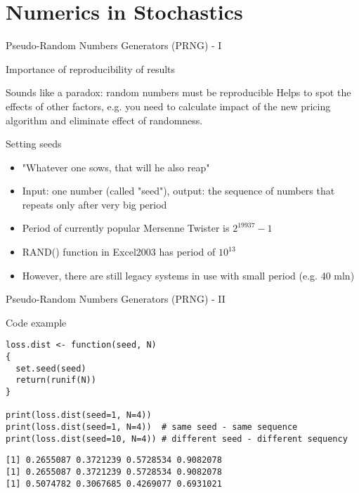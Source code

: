 \documentclass[presentation]{beamer}
\begin{document}
\section{Numerics in Stochastics}
\label{sec-2}
\begin{frame}[label=sec-2-1]{Pseudo-Random Numbers Generators (PRNG) - I}
\begin{block}{Importance of reproducibility of results}
\begin{block}{Sounds like a paradox: random numbers must be reproducible}
Helps to spot the effects of other factors, e.g. you need to calculate impact of the new pricing algorithm and eliminate effect of randomness.
\end{block}
\end{block}
\begin{block}{Setting seeds}
\begin{itemize}
\item "Whatever one sows, that will he also reap"
\item Input: one number (called "seed"), output: the sequence of numbers that repeats only after very big period
\item Period of currently popular Mersenne Twister is $2^{19937} - 1$
\item RAND() function in Excel2003 has period of $10^{13}$
\item However, there are still legacy systems in use with small period (e.g. 40 mln)
\end{itemize}
\end{block}
\end{frame}
\begin{frame}[fragile,label=sec-2-2]{Pseudo-Random Numbers Generators (PRNG) - II}
 \begin{block}{Code example}
\begin{verbatim}
loss.dist <- function(seed, N)
{
  set.seed(seed)
  return(runif(N))
}

print(loss.dist(seed=1, N=4))
print(loss.dist(seed=1, N=4))  # same seed - same sequence
print(loss.dist(seed=10, N=4)) # different seed - different sequency
\end{verbatim}

\begin{verbatim}
[1] 0.2655087 0.3721239 0.5728534 0.9082078
[1] 0.2655087 0.3721239 0.5728534 0.9082078
[1] 0.5074782 0.3067685 0.4269077 0.6931021
\end{verbatim}
\end{block}
\end{frame}
\end{document}
